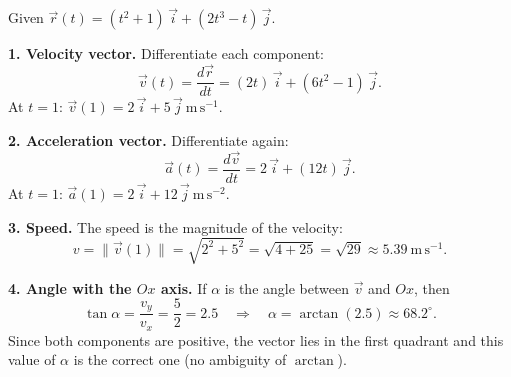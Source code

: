 \documentclass[11pt]{article}
\begin{document}
\begin{corrige}
Given $\vec{r}(t) = (t^2+1)\,\vec{i} + (2t^3 - t)\,\vec{j}$.

\textbf{1. Velocity vector.} Differentiate each component:
\[ \vec{v}(t) = \frac{d\vec{r}}{dt} = (2t)\,\vec{i} + (6t^2 - 1)\,\vec{j}. \]
At $t = 1$: $\vec{v}(1) = 2\,\vec{i} + 5\,\vec{j}\ \mathrm{m\,s^{-1}}$.

\textbf{2. Acceleration vector.} Differentiate again:
\[ \vec{a}(t) = \frac{d\vec{v}}{dt} = 2\,\vec{i} + (12t)\,\vec{j}. \]
At $t = 1$: $\vec{a}(1) = 2\,\vec{i} + 12\,\vec{j}\ \mathrm{m\,s^{-2}}$.

\textbf{3. Speed.} The speed is the magnitude of the velocity:
\[ v = \|\vec{v}(1)\| = \sqrt{2^2 + 5^2} = \sqrt{4 + 25} = \sqrt{29} \approx 5.39\ \mathrm{m\,s^{-1}}. \]

\textbf{4. Angle with the $Ox$ axis.} If $\alpha$ is the angle between $\vec{v}$ and $Ox$, then
\[ \tan\alpha = \frac{v_y}{v_x} = \frac{5}{2} = 2.5 \quad\Longrightarrow\quad \alpha = \arctan(2.5) \approx 68.2^\circ. \]
Since both components are positive, the vector lies in the first quadrant and this value of $\alpha$ is the correct one (no ambiguity of $\arctan$).
\end{corrige}
\end{document}
